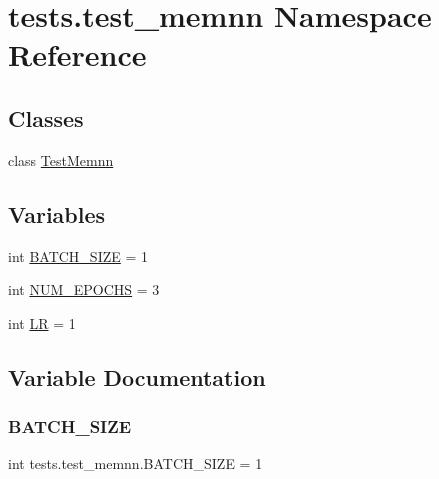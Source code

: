 \hypertarget{namespacetests_1_1test__memnn}{}\section{tests.\+test\+\_\+memnn Namespace Reference}
\label{namespacetests_1_1test__memnn}
\subsection*{Classes}
\begin{DoxyCompactItemize}
\item 
class \hyperlink{classtests_1_1test__memnn_1_1TestMemnn}{Test\+Memnn}
\end{DoxyCompactItemize}
\subsection*{Variables}
\begin{DoxyCompactItemize}
\item 
int \hyperlink{namespacetests_1_1test__memnn_ad1215c53a59eca972ffecfe07229c49c}{B\+A\+T\+C\+H\+\_\+\+S\+I\+ZE} = 1
\item 
int \hyperlink{namespacetests_1_1test__memnn_ae5ec84302f08d0f0df841afb6fc1fef6}{N\+U\+M\+\_\+\+E\+P\+O\+C\+HS} = 3
\item 
int \hyperlink{namespacetests_1_1test__memnn_a87ccdcaecd71ad2810a32591292724eb}{LR} = 1
\end{DoxyCompactItemize}


\subsection{Variable Documentation}
\mbox{\label{namespacetests_1_1test__memnn_ad1215c53a59eca972ffecfe07229c49c}} 
\subsubsection{\texorpdfstring{B\+A\+T\+C\+H\+\_\+\+S\+I\+ZE}{BATCH\_SIZE}}
{\footnotesize\ttfamily int tests.\+test\+\_\+memnn.\+B\+A\+T\+C\+H\+\_\+\+S\+I\+ZE = 1}

\mbox{\label{namespacetests_1_1test__memnn_a87ccdcaecd71ad2810a32591292724eb}} 
